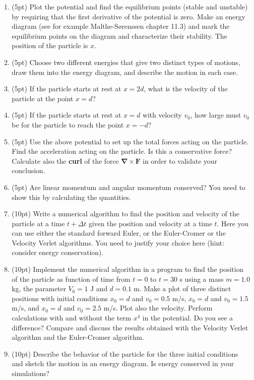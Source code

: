 \documentclass[%
oneside,                 %
final,                   %
10pt]{article}
\begin{document}
\begin{enumerate}
\item (5pt) Plot the potential and find the  equilibrium points (stable and unstable) by requiring that the first derivative of the potential is zero. Make an energy diagram (see for example Malthe-Sørenssen chapter 11.3) and mark the equilibrium points on the diagram and characterize their stability. The position of the particle is $x$. 

\item (5pt) Choose two different energies that give two distinct types of motions, draw them into the energy diagram, and describe the motion in each case.

\item (5pt) If the particle  starts at rest at $x=2d$, what is the velocity of the particle at the point $x=d$?

\item (5pt) If the particle  starts at rest at $x=d$ with velocity $v_0$, how large must $v_0$ be for the  particle to reach the point $x=−d$?

\item (5pt) Use the above potential to set up the total forces acting on the particle.  Find the acceleration acting on the particle. Is this a conservative force? Calculate also the \textbf{curl} of the force  $\bm{\nabla}\times \bm{F}$ in order to validate your conclusion. 

\item (5pt) Are linear momentum and angular momentum conserved? You need to show this by calculating the quantities.

\item (10pt) Write a numerical algorithm to find the position and velocity of the particle at a time $t+\Delta t$ given the position and velocity at a time $t$. Here you can use either the standard forward Euler, or the Euler-Cromer or the Velocity Verlet algorithms.   You need to justify your choice here (hint: consider energy conservation).

\item (10pt) Implement the numerical algorithm in a program to find the position of the particle as function of time from $t=0$ to $t=30$ s using a mass  $m=1.0$ kg, the parameter $V_0=1$ J and $d=0.1$ m. Make a plot of three distinct positions with initial conditions $x_0=d$ and $v_0=0.5$ m/s, $x_0=d$ and $v_0=1.5$ m/s, and $x_0=d$ and $v_0=2.5$ m/s. Plot also the velocity.  Perform calculations with and without the term $x^4$ in the potential. Do you see a difference? Compare and discuss the results obtained with the Velocity Verlet algorithm and the Euler-Cromer algorithm. 

\item (10pt) Describe the behavior of the particle for the three initial conditions  and sketch the motion in an energy diagram. Is energy conserved in your simulations?
\end{enumerate}
\end{document}
